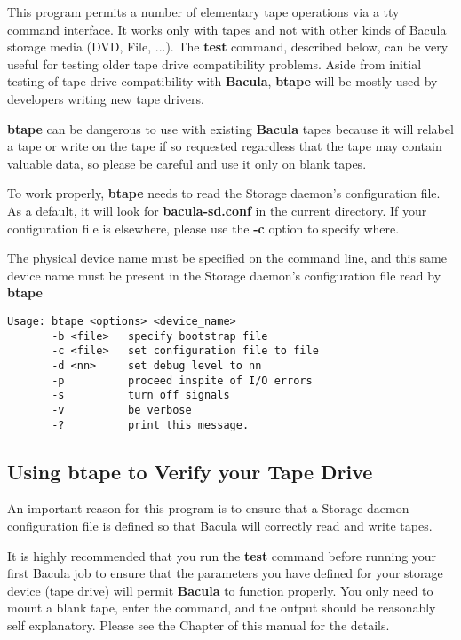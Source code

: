 This program permits a number of elementary tape operations via a tty command
interface. It works only with tapes and not with other kinds of Bacula
storage media (DVD, File, ...).  The {\bf test} command, described below,
can be very useful for testing older tape drive compatibility problems.
Aside from initial testing of tape drive compatibility with {\bf Bacula},
{\bf btape} will be mostly used by developers writing new tape drivers.

{\bf btape} can be dangerous to use with existing {\bf Bacula} tapes because
it will relabel a tape or write on the tape if so requested regardless that
the tape may contain valuable data, so please be careful and use it only on
blank tapes. 

To work properly, {\bf btape} needs to read the Storage daemon's configuration
file. As a default, it will look for {\bf bacula-sd.conf} in the current
directory. If your configuration file is elsewhere, please use the {\bf -c}
option to specify where. 

The physical device name must be specified on the command line, and this
same device name must be present in the Storage daemon's configuration file
read by {\bf btape} 

\footnotesize
\begin{verbatim}
Usage: btape <options> <device_name>
       -b <file>   specify bootstrap file
       -c <file>   set configuration file to file
       -d <nn>     set debug level to nn
       -p          proceed inspite of I/O errors
       -s          turn off signals
       -v          be verbose
       -?          print this message.
\end{verbatim}
\normalsize

\subsection{Using btape to Verify your Tape Drive}

An important reason for this program is to ensure that a Storage daemon
configuration file is defined so that Bacula will correctly read and write
tapes. 

It is highly recommended that you run the {\bf test} command before running
your first Bacula job to ensure that the parameters you have defined for your
storage device (tape drive) will permit {\bf Bacula} to function properly. You
only need to mount a blank tape, enter the command, and the output should be
reasonably self explanatory. Please see the 
 Chapter of this manual for
the details. 

